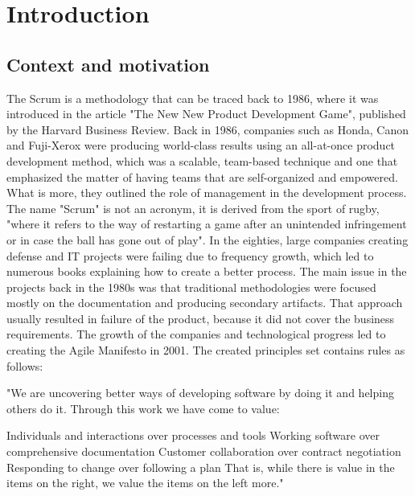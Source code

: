 \chapter{Introduction}
\section{Context and motivation}
The Scrum is a methodology that can be traced back to 1986, where it was introduced in the article "The New New Product Development Game"\cite{ScrumHarvardBib, ScrumBook}, published by the Harvard Business Review. Back in 1986, companies such as Honda, Canon and Fuji-Xerox were producing world-class results using an all-at-once product development method, which was a scalable, team-based technique and one that emphasized the matter of having teams that are self-organized and empowered. What is more, they outlined the role of management in the development process. The name "Scrum" is not an acronym, it is derived from the sport of rugby, "where it refers to the way of restarting a game after an unintended infringement or in case the ball has gone out of play"\cite{AgileBook}. In the eighties, large companies creating defense and IT projects were failing due to frequency growth, which led to numerous books explaining how to create a better process. The main issue in the projects back in the 1980s was that traditional methodologies were focused mostly on the documentation and producing secondary artifacts. That approach usually resulted in failure of the product, because it did not cover the business requirements. The growth of the companies and technological progress led to creating the Agile Manifesto in 2001\cite{AgileManifesto, AgileBook}. The created principles set contains rules as follows:

"We are uncovering better ways of developing
software by doing it and helping others do it.
Through this work we have come to value:

Individuals and interactions over processes and tools \hfill \break
Working software over comprehensive documentation \hfill \break
Customer collaboration over contract negotiation \hfill \break
Responding to change over following a plan \hfill \break
That is, while there is value in the items on
the right, we value the items on the left more."\cite{AgileManifesto}

